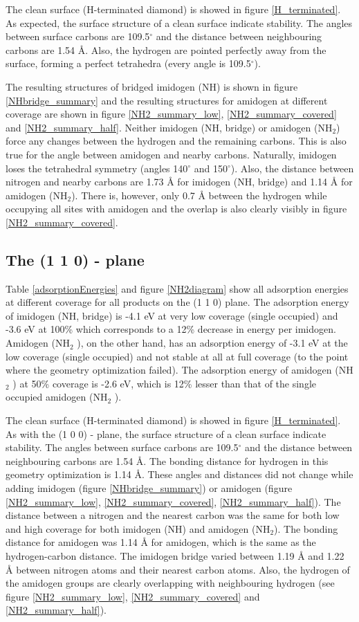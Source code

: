 \documentclass[10pt,a4paper]{article}
\begin{document}
The clean surface (H-terminated diamond) is showed in figure \ref{H_terminated}. As expected, the surface structure of a clean surface indicate stability. The angles between surface carbons are 109.5$^{\circ}$ and the distance between neighbouring carbons are 1.54 Å. Also, the hydrogen are pointed perfectly away from the surface, forming a perfect tetrahedra (every angle is 109.5$^{\circ}$).

The resulting structures of bridged imidogen (NH) is shown in figure \ref{NHbridge_summary} and the resulting structures for amidogen at different coverage are shown in figure \ref{NH2_summary_low}, \ref{NH2_summary_covered} and \ref{NH2_summary_half}.  Neither imidogen (NH, bridge) or amidogen (NH$_2$) force any changes between the hydrogen and the remaining carbons. This is also true for the angle between amidogen and nearby carbons. Naturally, imidogen loses the tetrahedral symmetry (angles 140$^{\circ}$ and 150$^{\circ}$). Also, the distance between nitrogen and nearby carbons are 1.73 Å for imidogen (NH, bridge) and 1.14 Å for amidogen (NH$_2$). There is, however, only 0.7 Å between the hydrogen while occupying all sites with amidogen and the overlap is also clearly visibly in figure \ref{NH2_summary_covered}.

\subsection{The (1 1 0) - plane}
Table \ref{adsorptionEnergies} and figure \ref{NH2diagram} show all adsorption energies at different coverage for all products on the (1 1 0) plane. The adsorption energy of imidogen (NH, bridge) is -4.1 eV at very low coverage (single occupied) and -3.6 eV at 100\% which corresponds to a 12\% decrease in energy per imidogen. Amidogen (NH$_2$ ), on the other hand, has an adsorption energy of -3.1 eV at the low coverage (single occupied) and not stable at all at full coverage (to the point where the geometry optimization failed). The adsorption energy of amidogen (NH$_2$ ) at 50\% coverage is -2.6 eV, which is 12\% lesser than that of the single occupied amidogen (NH$_2$ ). 


The clean surface (H-terminated diamond) is showed in figure \ref{H_terminated}. As with the (1 0 0) - plane, the surface structure of a clean surface indicate stability. The angles between surface carbons are 109.5$^{\circ}$ and the distance between neighbouring carbons are 1.54 Å. The bonding distance for hydrogen in this geometry optimization is 1.14 Å. These angles and distances did not change while adding imidogen (figure \ref{NHbridge_summary}) or amidogen (figure \ref{NH2_summary_low},   \ref{NH2_summary_covered}, \ref{NH2_summary_half}). The distance between a nitrogen and the nearest carbon was the same for both low and high coverage for both imidogen (NH) and amidogen (NH$_2$). The bonding distance for amidogen was 1.14 Å for amidogen, which is the same as the hydrogen-carbon distance. The imidogen bridge varied between 1.19 Å and 1.22 Å between nitrogen atoms and their nearest carbon atoms. Also, the hydrogen of the amidogen groups are clearly overlapping with neighbouring hydrogen (see figure \ref{NH2_summary_low}, \ref{NH2_summary_covered} and \ref{NH2_summary_half}).
\end{document}
